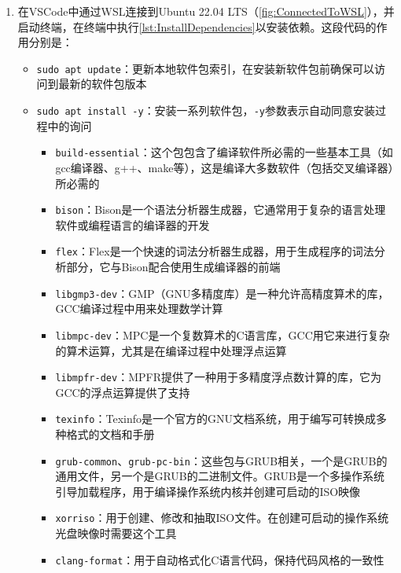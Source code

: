 \begin{enumerate}
    \item 在VSCode中通过WSL连接到Ubuntu 22.04 LTS（\cref{fig:ConnectedToWSL}），并启动终端，在终端中执行\cref{lst:InstallDependencies}以安装依赖。这段代码的作用分别是：
          \begin{itemize}
              \item \texttt{sudo apt update}：更新本地软件包索引，在安装新软件包前确保可以访问到最新的软件包版本
              \item \texttt{sudo apt install -y}：安装一系列软件包，\texttt{-y}参数表示自动同意安装过程中的询问
                    \begin{itemize}
                        \item \texttt{build-essential}：这个包包含了编译软件所必需的一些基本工具（如gcc编译器、g++、make等），这是编译大多数软件（包括交叉编译器）所必需的
                        \item \texttt{bison}：Bison是一个语法分析器生成器，它通常用于复杂的语言处理软件或编程语言的编译器的开发
                        \item \texttt{flex}：Flex是一个快速的词法分析器生成器，用于生成程序的词法分析部分，它与Bison配合使用生成编译器的前端
                        \item \texttt{libgmp3-dev}：GMP（GNU多精度库）是一种允许高精度算术的库，GCC编译过程中用来处理数学计算
                        \item \texttt{libmpc-dev}：MPC是一个复数算术的C语言库，GCC用它来进行复杂的算术运算，尤其是在编译过程中处理浮点运算
                        \item \texttt{libmpfr-dev}：MPFR提供了一种用于多精度浮点数计算的库，它为GCC的浮点运算提供了支持
                        \item \texttt{texinfo}：Texinfo是一个官方的GNU文档系统，用于编写可转换成多种格式的文档和手册
                        \item \texttt{grub-common}、\texttt{grub-pc-bin}：这些包与GRUB相关，一个是GRUB的通用文件，另一个是GRUB的二进制文件。GRUB是一个多操作系统引导加载程序，用于编译操作系统内核并创建可启动的ISO映像
                        \item \texttt{xorriso}：用于创建、修改和抽取ISO文件。在创建可启动的操作系统光盘映像时需要这个工具
                        \item \texttt{clang-format}：用于自动格式化C语言代码，保持代码风格的一致性
                    \end{itemize}
          \end{itemize}

\end{enumerate}
